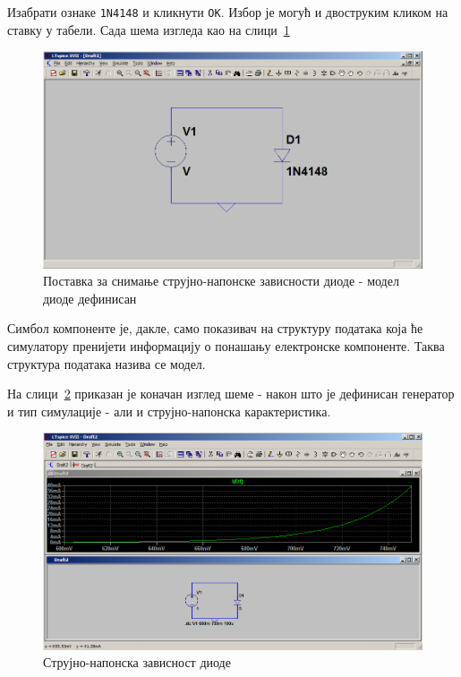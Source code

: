 Изабрати ознаке \texttt{1N4148} и кликнути \texttt{OK}. Избор је могућ и двоструким кликом на ставку у табели. Сада шема изгледа као на слици~\ref{Fig:d-dc4}

\begin{figure}[h]
\centering
\includegraphics[width=\figwidth\textwidth]{figs/d-dc4.PNG}
\caption{Поставка за снимање струјно-напонске зависности диоде - модел диоде дефинисан}
\label{Fig:d-dc4}
\end{figure}

Симбол компоненте је, дакле, само показивач на структуру података која ће симулатору пренијети информацију о понашању електронске компоненте. Таква структура података назива се модел.

На слици~\ref{Fig:d-dc5} приказан је коначан изглед шеме - након што је дефинисан генератор и тип симулације - али и струјно-напонска карактеристика.

\begin{figure}[h]
\centering
\includegraphics[width=\figwidth\textwidth]{figs/d-dc5.PNG}
\caption{Струјно-напонска зависност диоде}
\label{Fig:d-dc5}
\end{figure}

